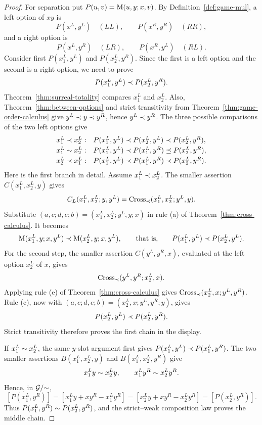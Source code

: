 \begin{proof}
  For separation put \(P(u,v)=\operatorname{M}(u,y;x,v)\).  By
  Definition~\ref{def:game-mul}, a left option of \(xy\) is
  \[
    P(x^L,y^L)\quad(LL),\qquad P(x^R,y^R)\quad(RR),
  \]
  and a right option is
  \[
    P(x^L,y^R)\quad(LR),\qquad P(x^R,y^L)\quad(RL).
  \]
  Consider first \(P(x^L_1,y^L)\) and \(P(x^L_2,y^R)\).  Since the first is a
  left option and the second is a right option, we need to prove
  \[
    P(x^L_1,y^L)\prec P(x^L_2,y^R).
  \]
  Theorem~\ref{thm:surreal-totality} compares \(x^L_1\) and \(x^L_2\).
  Also, Theorem~\ref{thm:between-options} and strict transitivity from
  Theorem~\ref{thm:game-order-calculus} give
  \(y^L\prec y\prec y^R\), hence \(y^L\prec y^R\).
  The three possible comparisons of the two left options give
  \[
    \begin{array}{ll}
    x^L_1\prec x^L_2:
      &P(x^L_1,y^L)\prec P(x^L_2,y^L)
         \prec P(x^L_2,y^R),\\[1mm]
    x^L_1\sim x^L_2:
      &P(x^L_1,y^L)\prec P(x^L_1,y^R)
         \preceq P(x^L_2,y^R),\\[1mm]
    x^L_2\prec x^L_1:
      &P(x^L_1,y^L)\prec P(x^L_1,y^R)
         \prec P(x^L_2,y^R).
    \end{array}
  \]
  Here is the first branch in detail.  Assume \(x^L_1\prec x^L_2\).  The
  smaller assertion \(C(x^L_1,x^L_2,y)\) gives
  \[
    C_L(x^L_1,x^L_2;y,y^L)
      =\operatorname{Cross}_{\prec}(x^L_1,x^L_2;y^L,y).
  \]
  Substitute
  \((a,c;d,e;b)=(x^L_1,x^L_2;y^L,y;x)\) in rule \textup{(a)} of
  Theorem~\ref{thm:cross-calculus}.  It becomes
  \[
    \operatorname{M}(x^L_1,y;x,y^L)\prec\operatorname{M}(x^L_2,y;x,y^L),
    \qquad\text{that is,}\qquad
    P(x^L_1,y^L)\prec P(x^L_2,y^L).
  \]
  For the second step, the smaller assertion \(C(y^L,y^R,x)\), evaluated at
  the left option \(x^L_2\) of \(x\), gives
  \[
    \operatorname{Cross}_{\prec}(y^L,y^R;x^L_2,x).
  \]
  Applying rule \textup{(e)} of Theorem~\ref{thm:cross-calculus} gives
  \(\operatorname{Cross}_{\prec}(x^L_2,x;y^L,y^R)\).  Rule \textup{(c)},
  now with
  \((a,c;d,e;b)=(x^L_2,x;y^L,y^R;y)\), gives
  \[
    P(x^L_2,y^L)\prec P(x^L_2,y^R).
  \]
  Strict transitivity therefore proves the first chain in the display.

  If \(x^L_1\sim x^L_2\), the same \(y\)-slot argument first gives
  \(P(x^L_1,y^L)\prec P(x^L_1,y^R)\).  The two smaller assertions
  \(B(x^L_1,x^L_2,y)\) and \(B(x^L_1,x^L_2,y^R)\) give
  \[
    x^L_1y\sim x^L_2y,
    \qquad
    x^L_1y^R\sim x^L_2y^R.
  \]
  Hence, in \(\mathcal{G}/{\sim}\),
  \[
    [P(x^L_1,y^R)]
      =[x^L_1y+xy^R-x^L_1y^R]
      =[x^L_2y+xy^R-x^L_2y^R]
      =[P(x^L_2,y^R)].
  \]
  Thus \(P(x^L_1,y^R)\sim P(x^L_2,y^R)\), and the strict--weak
  composition law proves the middle chain.


\end{proof}
